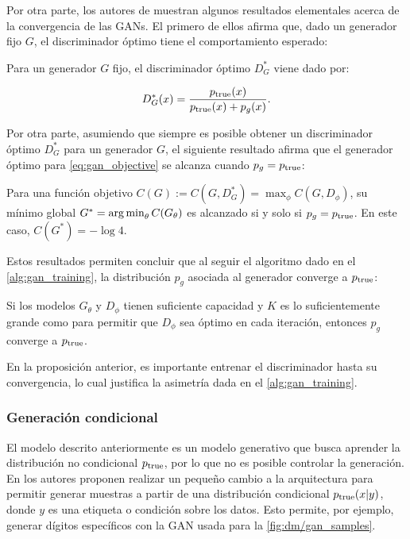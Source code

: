 Por otra parte, los autores de \cite{goodfellow2014generative} muestran algunos resultados elementales acerca de la convergencia de las GANs. El primero de ellos afirma que, dado un generador fijo $G$, el discriminador óptimo tiene el comportamiento esperado:

\begin{prop}
	Para un generador $G$ fijo, el discriminador óptimo $D^*_G$ viene dado por:

	\begin{equation*}
		D^*_G(x) = \frac{p_{\operatorname{true}}(x)}{p_{\operatorname{true}}(x) + p_g(x)}.
	\end{equation*}
\end{prop}

Por otra parte, asumiendo que siempre es posible obtener un discriminador óptimo $D_G^*$ para un generador $G$, el siguiente resultado afirma que el generador óptimo para \eqref{eq:gan_objective} se alcanza cuando $p_g=p_{\operatorname{true}}$:

\begin{prop}
	Para una función objetivo $C(G):=C(G, D_G^*) = \max_\phi C(G, D_\phi)$, su mínimo global $G^*=\operatorname*{arg\,min}_\theta C(G_\theta)$ es alcanzado si y solo si $p_g=p_{\operatorname{true}}$. En este caso, $C(G^*)=-\log 4$.
\end{prop}

Estos resultados permiten concluir que al seguir el algoritmo dado en el \autoref{alg:gan_training}, la distribución $p_g$ asociada al generador converge a $p_{\operatorname{true}}$:

\begin{prop}
	Si los modelos $G_\theta$ y $D_\phi$ tienen suficiente capacidad y $K$ es lo suficientemente grande como para permitir que $D_\phi$ sea óptimo en cada iteración, entonces $p_g$ converge a $p_{\operatorname{true}}$.
\end{prop}

En la proposición anterior, es importante entrenar el discriminador hasta su convergencia, lo cual justifica la asimetría dada en el \autoref{alg:gan_training}.

\subsubsection{Generación condicional}

El modelo descrito anteriormente es un modelo generativo que busca aprender la distribución no condicional $p_{\operatorname{true}}$, por lo que no es posible controlar la generación. En \cite{mirza2014conditional} los autores proponen realizar un pequeño cambio a la arquitectura para  permitir generar muestras a partir de una distribución condicional $p_{\operatorname{true}}(x|y)$, donde $y$ es una etiqueta o condición sobre los datos. Esto permite, por ejemplo, generar dígitos específicos con la GAN usada para la \autoref{fig:dm/gan_samples}.

